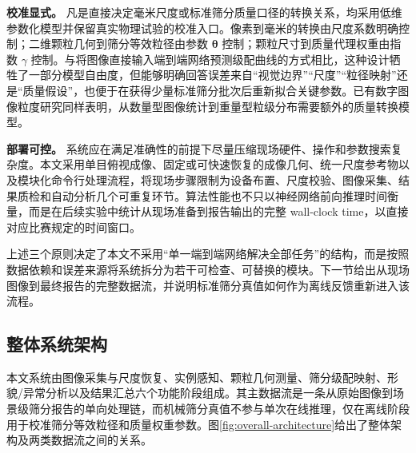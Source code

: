\textbf{校准显式。} 凡是直接决定毫米尺度或标准筛分质量口径的转换关系，均采用低维参数化模型并保留真实物理试验的校准入口。像素到毫米的转换由尺度系数明确控制；二维颗粒几何到筛分等效粒径由参数 $\boldsymbol{\theta}$ 控制；颗粒尺寸到质量代理权重由指数 $\gamma$ 控制。与将图像直接输入端到端网络预测级配曲线的方式相比\cite{coenen2022learningToSieve,buscombe2020sedinet}，这种设计牺牲了一部分模型自由度，但能够明确回答误差来自“视觉边界”“尺度”“粒径映射”还是“质量假设”，也便于在获得少量标准筛分批次后重新拟合关键参数。已有数字图像粒度研究同样表明，从数量型图像统计到重量型粒级分布需要额外的质量转换模型\cite{maiti2017massModel}。

\textbf{部署可控。} 系统应在满足准确性的前提下尽量压缩现场硬件、操作和参数搜索复杂度。本文采用单目俯视成像、固定或可快速恢复的成像几何、统一尺度参考物以及模块化命令行处理流程，将现场步骤限制为设备布置、尺度校验、图像采集、结果质检和自动分析几个可重复环节。算法性能也不只以神经网络前向推理时间衡量，而是在后续实验中统计从现场准备到报告输出的完整 wall-clock time，以直接对应比赛规定的时间窗口。

上述三个原则决定了本文不采用“单一端到端网络解决全部任务”的结构，而是按照数据依赖和误差来源将系统拆分为若干可检查、可替换的模块。下一节给出从现场图像到最终报告的完整数据流，并说明标准筛分真值如何作为离线反馈重新进入该流程。

\subsection{整体系统架构}
\label{sec:overall-architecture}

本文系统由图像采集与尺度恢复、实例感知、颗粒几何测量、筛分级配映射、形貌/异常分析以及结果汇总六个功能阶段组成。其主数据流是一条从原始图像到场景级筛分报告的单向处理链，而机械筛分真值不参与单次在线推理，仅在离线阶段用于校准筛分等效粒径和质量权重参数。图\ref{fig:overall-architecture}给出了整体架构及两类数据流之间的关系。

